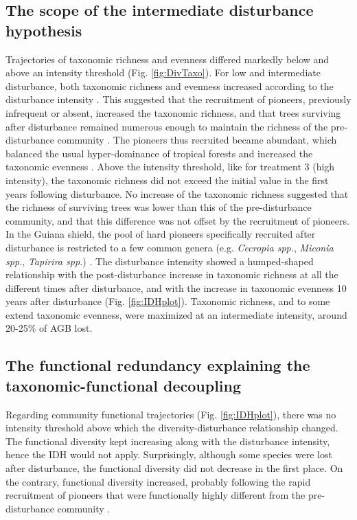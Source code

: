 \documentclass[fleqn,10pt]{ArtEcoFoG} %
\begin{document}
\subsection{The scope of the intermediate disturbance
hypothesis}\label{the-scope-of-the-intermediate-disturbance-hypothesis}

Trajectories of taxonomic richness and evenness differed markedly below
and above an intensity threshold (Fig. \ref{fig:DivTaxo}). For low and
intermediate disturbance, both taxonomic richness and evenness increased
according to the disturbance intensity
\citep{Martin2015, Chaudhary2016}. This suggested that the recruitment
of pioneers, previously infrequent or absent, increased the taxonomic
richness, and that trees surviving after disturbance remained numerous
enough to maintain the richness of the pre-disturbance community
\citep{Bongers2009}. The pioneers thus recruited became abundant, which
balanced the usual hyper-dominance of tropical forests and increased the
taxonomic evenness \citep{Baraloto2012a}. Above the intensity threshold,
like for treatment 3 (high intensity), the taxonomic richness did not
exceed the initial value in the first years following disturbance. No
increase of the taxonomic richness suggested that the richness of
surviving trees was lower than this of the pre-disturbance community,
and that this difference was not offset by the recruitment of pioneers.
In the Guiana shield, the pool of \color{red}hard \color{black} pioneers
specifically recruited after disturbance is restricted to a few common
genera (e.g. \emph{Cecropia spp.}, \emph{Miconia spp.}, \emph{Tapirira
spp.}) \citep{Guitet2018}. \color{red}The disturbance intensity showed a
humped-shaped relationship with the post-disturbance increase in
taxonomic richness at all the different times after disturbance, and
with the increase in taxonomic evenness 10 years after disturbance (Fig.
\ref{fig:IDHplot}).\color{black} Taxonomic richness, and to some extend
taxonomic evenness, were maximized at an intermediate intensity, around
20-25\% of AGB lost.

\subsection{The functional redundancy explaining the
taxonomic-functional
decoupling}\label{the-functional-redundancy-explaining-the-taxonomic-functional-decoupling}

\color{red}Regarding community functional trajectories (Fig.
\ref{fig:IDHplot}), there was no intensity threshold above which the
diversity-disturbance relationship changed. The functional diversity
kept increasing along with the disturbance intensity, hence the IDH
would not apply. Surprisingly, although some species were lost after
disturbance, the functional diversity did not decrease in the first
place. On the contrary, functional diversity increased, probably
following the rapid recruitment of pioneers that were functionally
highly different from the pre-disturbance community
\citep{Denslow1980, Molino2001}.
\end{document}
